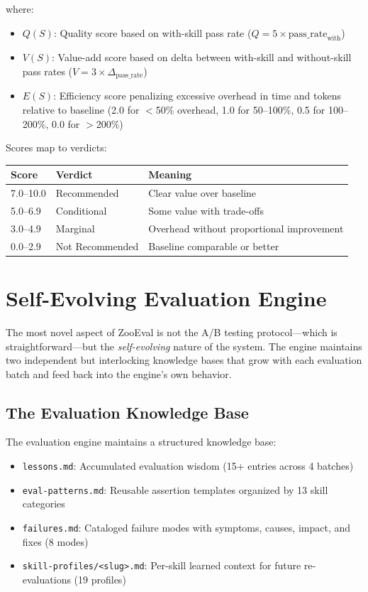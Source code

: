 \documentclass[11pt,a4paper]{article}
\begin{document}
where:
\begin{itemize}[leftmargin=*]
    \item $Q(S)$: Quality score based on with-skill pass rate ($Q = 5 \times \text{pass\_rate}_{\text{with}}$)
    \item $V(S)$: Value-add score based on delta between with-skill and without-skill pass rates ($V = 3 \times \Delta_{\text{pass\_rate}}$)
    \item $E(S)$: Efficiency score penalizing excessive overhead in time and tokens relative to baseline (2.0 for $<$50\% overhead, 1.0 for 50--100\%, 0.5 for 100--200\%, 0.0 for $>$200\%)
\end{itemize}

Scores map to verdicts:
\begin{center}
\begin{tabular}{lll}
\toprule
\textbf{Score} & \textbf{Verdict} & \textbf{Meaning} \\
\midrule
7.0--10.0 & Recommended & Clear value over baseline \\
5.0--6.9 & Conditional & Some value with trade-offs \\
3.0--4.9 & Marginal & Overhead without proportional improvement \\
0.0--2.9 & Not Recommended & Baseline comparable or better \\
\bottomrule
\end{tabular}
\end{center}

\section{Self-Evolving Evaluation Engine}
\label{sec:selfevolve}

The most novel aspect of ZooEval is not the A/B testing protocol---which is straightforward---but the \emph{self-evolving} nature of the system. The engine maintains two independent but interlocking knowledge bases that grow with each evaluation batch and feed back into the engine's own behavior.

\subsection{The Evaluation Knowledge Base}

The evaluation engine maintains a structured knowledge base:

\begin{itemize}[leftmargin=*]
    \item \texttt{lessons.md}: Accumulated evaluation wisdom (15+ entries across 4 batches)
    \item \texttt{eval-patterns.md}: Reusable assertion templates organized by 13 skill categories
    \item \texttt{failures.md}: Cataloged failure modes with symptoms, causes, impact, and fixes (8 modes)
    \item \texttt{skill-profiles/<slug>.md}: Per-skill learned context for future re-evaluations (19 profiles)
\end{itemize}
\end{document}
